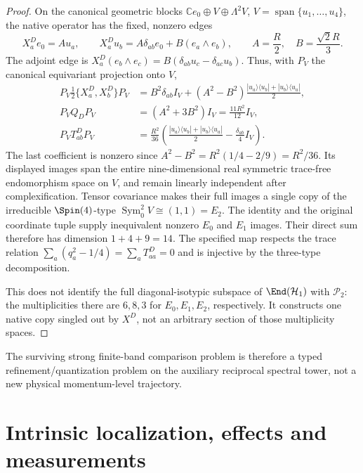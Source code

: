 \documentclass[12pt,a4paper]{article}
\begin{document}
\begin{proof}
On the canonical geometric blocks
$\mathbb Ce_0\oplus V\oplus\Lambda^2V$,
$V=\operatorname{span}\{u_1,\ldots,u_4\}$,
the native operator has the fixed, nonzero edges
\[
 X_a^De_0=A u_a,\qquad
 X_a^Du_b=A\delta_{ab}e_0+B(e_a\wedge e_b),
 \qquad A=\frac R2,\quad B=\frac{\sqrt2 R}{3}.
\]
The adjoint edge is
$X_a^D(e_b\wedge e_c)=B(\delta_{ab}u_c-\delta_{ac}u_b)$.
Thus, with $P_V$ the canonical equivariant projection onto $V$,
\[
 \begin{split}
 P_V\frac12\{X_a^D,X_b^D\}P_V
 &= B^2\delta_{ab}I_V+
   (A^2-B^2)\frac{|u_a\rangle\langle u_b|+
                          |u_b\rangle\langle u_a|}{2},\\
 P_VQ_DP_V&=(A^2+3B^2)I_V=\frac{11R^2}{12}I_V,\\
 P_VT_{ab}^DP_V
 &=\frac{R^2}{36}\left(
    \frac{|u_a\rangle\langle u_b|+|u_b\rangle\langle u_a|}{2}
                   -\frac{\delta_{ab}}4I_V\right).
 \end{split}
\]
The last coefficient is nonzero since
$A^2-B^2=R^2(1/4-2/9)=R^2/36$.
Its displayed images span the entire nine-dimensional real symmetric
trace-free endomorphism space on $V$, and remain linearly independent
after complexification.  Tensor covariance makes their full images a
single copy of the irreducible $\Spin(4)$-type
$\operatorname{Sym}^2_0 V\cong(1,1)=E_2$.
The identity and the original coordinate tuple supply inequivalent
nonzero $E_0$ and $E_1$ images.  Their direct sum therefore has dimension
$1+4+9=14$.  The specified map respects the trace relation
$\sum_a(q_a^2-1/4)=\sum_aT_{aa}^D=0$ and is injective by the
three-type decomposition.

This does not identify the full diagonal-isotypic subspace of
$\End(\mathcal H_1)$ with $\mathcal P_2$: the multiplicities there
are $6,8,3$ for $E_0,E_1,E_2$, respectively.  It constructs one
native copy singled out by $X^D$, not an arbitrary section of those
multiplicity spaces.
\end{proof}

The surviving strong finite-band comparison problem is therefore a typed
refinement/quantization problem on the auxiliary reciprocal spectral tower,
not a new physical momentum-level trajectory.

\section{Intrinsic localization, effects and measurements}
\label{paper2c:sec:organized-localization}
\end{document}
